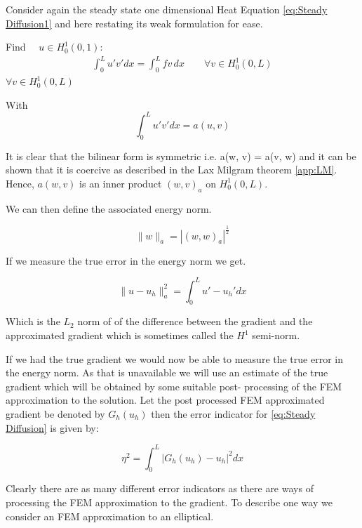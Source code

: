 \documentclass{uonmathreport}
\theoremstyle{definition}
\theoremstyle{problem}
\theoremstyle{theorem}
\begin{document}
Consider again the steady state one dimensional Heat Equation \ref{eq:Steady Diffusion1} and here restating its weak formulation for ease.


Find $\quad u \in H^1_0(0, 1)$:
\begin{align*}
\int_0^L  u' v'  dx =   \int_0^L  f v\, dx  \quad \quad  \forall v \in H^1_0(0, L)
\end{align*}
$\forall v \in H^1_0(0, L)$

With
\begin{equation*}
\int_0^L  u' v'  dx = a(u, v)  	
\end{equation*}

It is clear that the bilinear form is symmetric i.e.  a(w, v) = a(v, w) and it can be shown that it is coercive as described in the Lax Milgram theorem \ref{app:LM}. Hence, $a(w, v)$ is an inner product $(w, v)_a$ on  $H^1_0(0, L)$.

We can then define the associated energy norm.

\begin{equation}
\|w\|_a = |(w, w)_a|^\frac{1}{2}
\end{equation}

If we measure the true error in the energy norm we get.

\begin{equation}
\|u-u_h\|_a^2 = \int_0^L  u' - u_h'  dx
\end{equation}

Which is the $L_2$ norm of of the difference between the gradient and the approximated gradient which is sometimes called the $H^1$ semi-norm.

If we had the true gradient we would now be able to measure the true error in the energy norm. As that is unavailable we will use an estimate of the true gradient which will be obtained by some suitable post- processing of the FEM approximation to the solution. Let the post processed FEM approximated gradient be denoted by $G_h(u_h)$ then the error indicator for \ref{eq:Steady Diffusion} is given by:

\begin{equation}
\eta^2 = \int_0^L  |G_h(u_h) - u_h|^2  dx
\end{equation}

Clearly there are as many different error indicators as there are ways of processing the FEM approximation to the gradient. To describe one way we consider an FEM approximation to an elliptical.

\begin{center}
\end{center}
\end{document}
